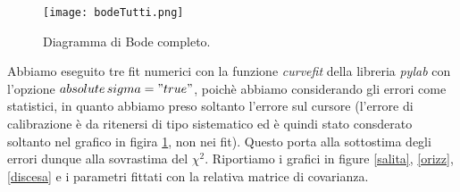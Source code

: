 \documentclass[10pt,a4paper]{article}
\begin{document}
\begin{figure}[!htb]
\centering
  \texttt{[image: bodeTutti.png]}
\caption{Diagramma di Bode completo.}
\label{tutteBode}
\end{figure}


Abbiamo eseguito tre fit numerici con la funzione \emph{curvefit} della libreria \emph{pylab} con l'opzione \emph{$absolute\,sigma = "true"$}, poichè abbiamo considerando gli errori come statistici, in quanto abbiamo preso soltanto l'errore sul cursore (l'errore di calibrazione è da ritenersi di tipo sistematico ed è quindi stato consderato soltanto nel grafico in figira \ref{tutteBode}, non nei fit). Questo porta alla sottostima degli errori dunque alla sovrastima del $\chi^2$. Riportiamo i grafici in figure \ref{salita}, \ref{orizz}, \ref{discesa} e i parametri fittati con la relativa matrice di covarianza.
\end{document}
